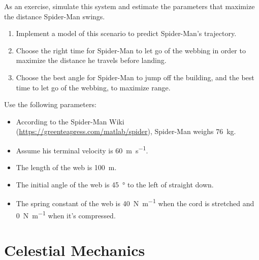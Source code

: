 As an exercise, simulate this system and estimate the parameters that maximize the distance Spider-Man swings.

\begin{enumerate}

\item
  Implement a model of this scenario to predict Spider-Man's trajectory.


\item
  Choose the right time for Spider-Man to let go of the webbing in order to maximize the distance he travels before landing.


\item
  Choose the best angle for Spider-Man to jump off the building, and the best time to let go of the webbing, to maximize range.


\end{enumerate}

Use the following parameters:


\begin{itemize}

\item According to the Spider-Man Wiki (\url{https://greenteapress.com/matlab/spider}), Spider-Man weighs \SI{76}{\kg}.

\item Assume his terminal velocity is \SI{60}{\meter\per\second}.


\item  The length of the web is \SI{100}{\meter}.

\item  The initial angle of the web is \SI{45}{\degree} to the left of straight
  down.

\item  The spring constant of the web is \SI{40}{\newton\per\meter} when the cord is stretched and \SI{0}{\newton\per\meter} when it's compressed.


\end{itemize}


\section{Celestial Mechanics}

